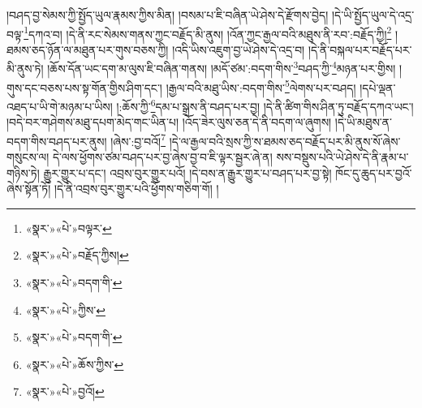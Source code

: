 །བཤད་བྱ་སེམས་ཀྱི་སྤྱོད་ཡུལ་རྣམས་ཀྱིས་མིན། །བསམ་པ་ཇི་བཞིན་ཡེ་ཤེས་དེ་རྫོགས་བྱེད། །དེ་ཡི་སྤྱོད་ཡུལ་དེ་འདྲ་བལྟ་\footnote{«སྣར་»«པེ་»བལྟར་}དཀའ་བ། །དེ་ནི་རང་སེམས་གནས་ཀྱང་བརྗོད་མི་ནུས། །འོན་ཀྱང་རྒྱལ་བའི་མཐུས་ནི་རབ་:བརྗོད་ཀྱི།\footnote{«སྣར་»«པེ་»བརྗོད་ཀྱིས།} །ཐམས་ཅད་ཉོན་ལ་མཐུན་པར་གུས་བཅས་ཀྱི། །འདི་ཡིས་འཇུག་བྱ་ཡེ་ཤེས་དེ་འདྲ་བ། །དེ་ནི་བསྐལ་པར་བརྗོད་པར་མི་ནུས་ཏེ། །ཆོས་དོན་ཡང་དག་མ་ལུས་ཇི་བཞིན་གནས། །མདོ་ཙམ་:བདག་གིས་\footnote{«སྣར་»«པེ་»བདག་གི་}བཤད་ཀྱི་\footnote{«སྣར་»«པེ་»ཀྱིས་}མཉན་པར་གྱིས། །གུས་དང་བཅས་པས་སྟ་གོན་གྱིས་ཤིག་དང་། །རྒྱལ་བའི་མཐུ་ཡིས་:བདག་གིས་\footnote{«སྣར་»«པེ་»བདག་གི་}ལེགས་པར་བཤད། །དཔེ་ལྡན་འཐད་པ་ཡི་གེ་མཉམ་པ་ཡིས། །:ཆོས་ཀྱི་\footnote{«སྣར་»«པེ་»ཆོས་ཀྱིས་}དམ་པ་སྒྲས་ནི་བཤད་པར་བྱ། །དེ་ནི་ཚིག་གིས་ཤིན་ཏུ་བརྗོད་དཀའ་ཡང་། །བདེ་བར་གཤེགས་མཐུ་དཔག་མེད་གང་ཡིན་པ། །འོད་ཟེར་ལུས་ཅན་དེ་ནི་བདག་ལ་ཞུགས། །དེ་ཡི་མཐུས་ན་བདག་གིས་བཤད་པར་ནུས། །ཞེས་:བྱ་བའོ།\footnote{«སྣར་»«པེ་»བྱའོ།} །དེ་ལ་རྒྱལ་བའི་སྲས་ཀྱི་ས་ཐམས་ཅད་བརྗོད་པར་མི་ནུས་སོ་ཞེས་གསུངས་ལ། དེ་ལས་ཕྱོགས་ཙམ་བཤད་པར་བྱ་ཞེས་བྱ་བ་ཇི་ལྟར་སྦྱར་ཞེ་ན། སས་བསྡུས་པའི་ཡེ་ཤེས་དེ་ནི་རྣམ་པ་གཉིས་ཏེ། རྒྱུར་གྱུར་པ་དང་། འབྲས་བུར་གྱུར་པའོ། །དེ་བས་ན་རྒྱུར་གྱུར་པ་བཤད་པར་བྱ་སྟེ། ཁོང་དུ་ཆུད་པར་བྱའོ་ཞེས་སྟོན་ཏོ། །དེ་ནི་འབྲས་བུར་གྱུར་པའི་ཕྱོགས་གཅིག་གོ། །
